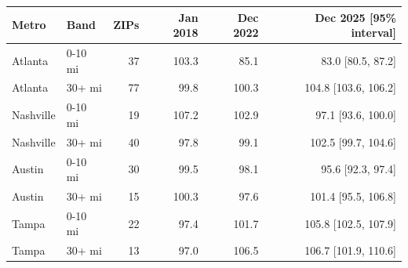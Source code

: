 \footnotesize\setlength{\tabcolsep}{4pt}
\begin{tabular}{llrrrr}
\toprule
Metro & Band & ZIPs & Jan 2018 & Dec 2022 & Dec 2025 [95\% interval] \\
\midrule
Atlanta & 0-10 mi & 37 & 103.3 & 85.1 & 83.0 [80.5, 87.2] \\
Atlanta & 30+ mi & 77 & 99.8 & 100.3 & 104.8 [103.6, 106.2] \\
Nashville & 0-10 mi & 19 & 107.2 & 102.9 & 97.1 [93.6, 100.0] \\
Nashville & 30+ mi & 40 & 97.8 & 99.1 & 102.5 [99.7, 104.6] \\
Austin & 0-10 mi & 30 & 99.5 & 98.1 & 95.6 [92.3, 97.4] \\
Austin & 30+ mi & 15 & 100.3 & 97.6 & 101.4 [95.5, 106.8] \\
Tampa & 0-10 mi & 22 & 97.4 & 101.7 & 105.8 [102.5, 107.9] \\
Tampa & 30+ mi & 13 & 97.0 & 106.5 & 106.7 [101.9, 110.6] \\
\bottomrule
\end{tabular}

